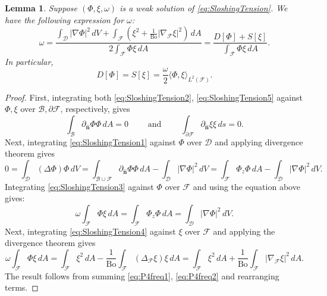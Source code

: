\documentclass[letterpaper, 12pt]{amsart}
\newtheorem{lemma}[definition]{Lemma}
\newcommand{\bond}{\mathrm{Bo}}
\newcommand{\D}{\mathcal{D}}
\newcommand{\B}{\mathcal{B}}
\newcommand{\F}{\mathcal{F}}
\newcommand{\n}{\mathbf{\hat{n}}}
\begin{document}
\begin{lemma}\label{thm:Property4_frequency}
Suppose $(\Phi,\xi,\omega)$ is a weak solution of \eqref{eq:SloshingTension}. We have the following expression for $\omega$:
\begin{equation}\label{eq:formsum}
\omega = \dfrac{\int_\D|\nabla\Phi|^2\, dV + \int_\F \left(\xi^2 + \frac{1}{\bond}|\nabla_\F\xi|^2\right)\, dA}{2\int_\F \Phi\xi\, dA} = \frac{D[\Phi] + S[\xi]}{\int_\F \Phi\xi\, dA} .
\end{equation}
In particular, 
\begin{equation}\label{eq:energy_equidist}
D[\Phi] = S[\xi] = \frac{\omega}{2}\langle\Phi,\xi\rangle_{L^2(\F)}.
\end{equation}
\end{lemma}
\begin{proof}
First, integrating both \eqref{eq:SloshingTension2}, \eqref{eq:SloshingTension5} against $\Phi,\xi$ over $\B, \partial\F$, respectively, gives
\[ \int_\B \partial_\n\Phi\Phi\, dA = 0\qquad\textrm{ and }\qquad\int_{\partial\F} \partial_\n\xi\xi\, ds = 0. \]
Next, integrating \eqref{eq:SloshingTension1} against $\Phi$ over $\D$ and applying divergence theorem gives
\[ 0 = \int_\D (\Delta\Phi)\Phi\, dV = \int_{\B\cup\F} \partial_\n\Phi\Phi\, dA - \int_\D|\nabla\Phi|^2\, dV = \int_\F\Phi_z\Phi\, dA - \int_\D|\nabla\Phi|^2\, dV. \]
Integrating \eqref{eq:SloshingTension3} against $\Phi$ over $\F$ and using the equation above gives:
\begin{equation}
\label{eq:P4freq1} \omega\int_\F\Phi\xi\, dA = \int_\F\Phi_z\Phi\, dA = \int_\D|\nabla\Phi|^2\, dV.
\end{equation}
Next, integrating  \eqref{eq:SloshingTension4} against $\xi$ over $\F$ and applying the divergence theorem gives
\begin{equation}
\label{eq:P4freq2} \omega\int_\F\Phi\xi\, dA = \int_\F\xi^2\, dA - \dfrac{1}{\bond}\int_\F (\Delta_\F\xi)\xi\, dA = \int_\F\xi^2\, dA + \dfrac{1}{\bond}\int_\F|\nabla_\F\xi|^2\, dA.
\end{equation}
The result follows from summing \eqref{eq:P4freq1}, \eqref{eq:P4freq2} and rearranging terms.
\end{proof}
\end{document}
